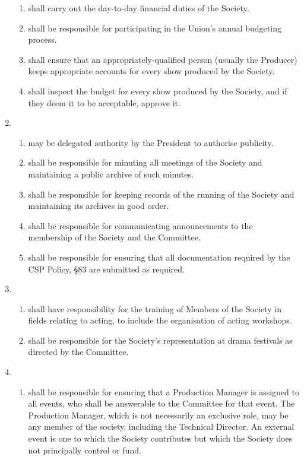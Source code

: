 \documentclass[a4paper]{tufte-handout}
\newcommand{\policyOffset}{12pt}
\newcommand{\policyPub}[2][\policyOffset]{\marginnote[#1]{\textsc{Publicity Policy \S#2}}}
\begin{document}
\begin{enumerate}[resume]
\begin{enumerate}
            \item shall carry out the day-to-day financial duties of the Society.
            \item shall be responsible for participating in the Union's annual budgeting process.
            \item shall ensure that an appropriately-qualified person (usually the Producer) keeps appropriate accounts for every show produced by the Society.
            \item shall inspect the budget for every show produced by the Society, and if they deem it to be acceptable, approve it.
        \end{enumerate}
    \item {}
        \begin{enumerate}
            \item \policyPub{4} may be delegated authority by the President to authorise publicity.
            \item shall be responsible for minuting all meetings of the Society and maintaining a public archive of such minutes.
            \item shall be responsible for keeping records of the running of the Society and maintaining its archives in good order.
            \item shall be responsible for communicating announcements to the membership of the Society and the Committee.
            \item shall be responsible for ensuring that all documentation required by the CSP Policy, \S83 are submitted as required.
        \end{enumerate}
    \item {}
        \begin{enumerate}
            \item shall have responsibility for the training of Members of the Society in fields relating to acting, to include the organisation of acting workshops.
            \item shall be responsible for the Society's representation at drama festivals as directed by the Committee.
        \end{enumerate}
    \item {}
        \begin{enumerate}
            \item shall be responsible for ensuring that a Production Manager is assigned to all events, who shall be answerable to the Committee for that event. The Production Manager, which is not necessarily an exclusive role, may be any member of the society, including the Technical Director. An external event is one to which the Society contributes but which the Society does not principally control or fund.

\end{enumerate}
\end{enumerate}
\end{document}
